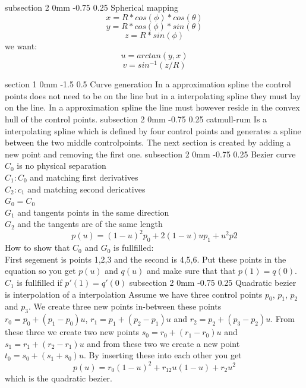 \documentclass[a4paper,11pt]{article}
\makeatletter
\renewcommand{\section}{\@startsection
   {section}%
   {1}%
   {0mm}%
   {-1.5\baselineskip}%
   {0.5\baselineskip}%
   {\sffamily\bfseries\upshape\normalsize}}%
\renewcommand{\subsection}{\@startsection
   {subsection}%
   {2}%
   {0mm}%
   {-0.75\baselineskip}%
   {0.25\baselineskip}%
   {\rmfamily\normalfont\slshape\normalsize}}%
\makeatother
\begin{document}
\subsection{Spherical mapping}
$$x=R*cos(\phi)*cos(\theta)$$
$$y=R*cos(\phi)*sin(\theta) $$
$$z=R*sin(\phi)$$
we want:
$$u=arctan(y,x)$$
$$v=sin^{-1}(z/R)$$

\section{Curve generation}
In a approximation spline the control points does not need to be on the line but in a interpolating spline they must lay on the line.  In a approximation spline the line must however reside in the convex hull of the control points.
\subsection{catmull-rum}
Is a interpolating spline which is defined by four control points and generates a spline between the two middle controlpoints. The next section is created by adding a new point and removing the first one.
\subsection{Bezier curve}
$C_0$ is no physical separation\\
$C_1:C_0$ and matching first derivatives\\
$C_2:c_1$ and matching second dericatives\\
$G_0=C_0$\\
$G_1$ and tangents points in the same direction\\
$G_2$ and the tangents are of the same length
$$p(u)=(1-u)^2p_0+2(1-u)up_1+u^2p2$$
How to show that $C_0$ and $G_0$ is fullfilled:\\
First segement is points 1,2,3 and the second is 4,5,6. Put these points in the equation so you get
$p(u)$ and $q(u)$ and make sure that that $p(1)=q(0)$. $C_1$ is fullfilled if $p'(1)=q'(0)$
\subsection{Quadratic bezier is interpolation of a interpolation}
Assume we have three control points $p_0$, $p_1$, $p_2$ and $p_3$. We create three new points in-between these points $r_0=p_0+(p_1-p_0)u$, $r_1=p_1+(p_2-p_1)u$ and $r_2=p_2+(p_3-p_2)u$. From these three we create two new points $s_0=r_0+(r_1-r_0)u$ and $s_1=r_1+(r_2-r_1)u$ and from these two we create a new point $t_0=s_0+(s_1+s_0)u$. By inserting these into each other you get $$p(u)=r_0(1-u)^2+r_12u(1-u)+r_2u^2$$ which is the quadratic bezier.
\end{document}
